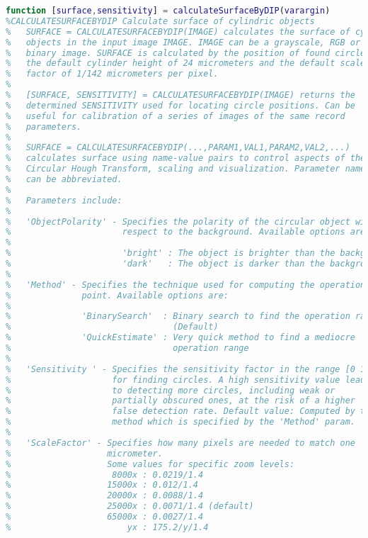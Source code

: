 \begin{lstlisting}[language=MATLAB, caption=Verfeinerung der lokalen Minima, label=lst:calculateSurfaceByDIP]
function [surface,sensitivity] = calculateSurfaceByDIP(varargin)
%CALCULATESURFACEBYDIP Calculate surface of cylindric objects
%   SURFACE = CALCULATESURFACEBYDIP(IMAGE) calculates the surface of cylindric
%   objects in the input image IMAGE. IMAGE can be a grayscale, RGB or
%   binary image. SURFACE is calculated by the position of found circles,
%   the default cylinder height of 24 micrometers and the default scale
%   factor of 1/142 micrometers per pixel.
%
%   [SURFACE, SENSITIVITY] = CALCULATESURFACEBYDIP(IMAGE) returns the
%   determined SENSITIVITY used for locating circle positions. Can be
%   useful for calibration of a series of images of the same record
%   parameters.
%
%   SURFACE = CALCULATESURFACEBYDIP(...,PARAM1,VAL1,PARAM2,VAL2,...)
%   calculates surface using name-value pairs to control aspects of the
%   Circular Hough Transform, scaling and visualization. Parameter names
%   can be abbreviated.
%
%   Parameters include:
%
%   'ObjectPolarity' - Specifies the polarity of the circular object with
%                      respect to the background. Available options are:
%
%                      'bright' : The object is brighter than the background.
%                      'dark'   : The object is darker than the background. (Default)
%
%   'Method' - Specifies the technique used for computing the operation
%              point. Available options are:
%
%              'BinarySearch'  : Binary search to find the operation range.
%                                (Default)
%              'QuickEstimate' : Very quick method to find a mediocre
%                                operation range
%
%   'Sensitivity ' - Specifies the sensitivity factor in the range [0 1]
%                    for finding circles. A high sensitivity value leads
%                    to detecting more circles, including weak or
%                    partially obscured ones, at the risk of a higher
%                    false detection rate. Default value: Computed by the
%                    method which is specified by the 'Method' param.
%
%   'ScaleFactor' - Specifies how many pixels are needed to match one
%                   micrometer.
%                   Some values for specific zoom levels:
%                    8000x : 0.0219/1.4
%                   15000x : 0.012/1.4
%                   20000x : 0.0088/1.4
%                   25000x : 0.0071/1.4 (default)
%                   65000x : 0.0027/1.4
%                       yx : 175.2/y/1.4

\end{lstlisting}

